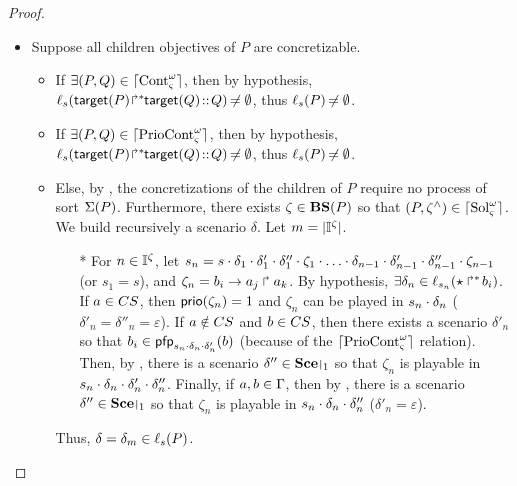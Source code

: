 \begin{proof}
\begin{itemize}
  \item Suppose all children objectives of $P$ are concretizable.
  \begin{itemize}
    \item If $\exists (P, Q) \in \lceil \mathrm{Cont}^\omega_\varsigma\rceil$, then by hypothesis,
      $\ell_{s}({\mathsf{target}(P)\!\Rsh^*\!\!\mathsf{target}(Q)} \!::\! Q) \not\nobreak\mkern -2mu = \emptyset$, thus
      $\ell_{s}(P) \not\nobreak\mkern -2mu = \emptyset$.
    \item If $\exists (P, Q) \in \lceil \mathrm{PrioCont}^\omega_\varsigma\rceil$, then by hypothesis,
      $\ell_{s}({\mathsf{target}(P)\!\Rsh^*\!\!\mathsf{target}(Q)} \!::\! Q) \not\nobreak\mkern -2mu = \emptyset$, thus
      $\ell_{s}(P) \not\nobreak\mkern -2mu = \emptyset$.
    \item Else, by , the concretizations of the children of $P$ require no process of sort $\Sigma(P)$.
      Furthermore, there exists $\zeta \in \mathbf{BS}(P)$ so that $(P, \zeta^\wedge) \in \lceil \mathrm{Sol}^\omega_\varsigma\rceil$.
      We build recursively a scenario $\delta$. Let $m = |\mathbb{I}^{\zeta}|$.
      \begin{itemize}
        \item[*] For $n \in \mathbb{I}^{\zeta}$, let $s_n = s \PHplay \delta_1 \PHplay \delta'_1 \PHplay \delta''_1 \PHplay \zeta_1 \PHplay \dots \PHplay \delta_{n-1} \PHplay \delta'_{n-1} \PHplay \delta''_{n-1} \PHplay \zeta_{n-1}$ (or $s_1 = s$),
          and $\zeta_n = b_i\rightarrow a_j\Rsh a_k$.
          By hypothesis, $\exists \delta_n \in \ell_{s_n}(\mbox{$\star\Rsh^*\!b_i$})$.
          If $a \in CS$, then $\mathsf{prio}(\zeta_n) = 1$ and $\zeta_n$ can be played in $s_n \cdot \delta_n$ (\ie $\delta'_n = \delta''_n = \varepsilon$).
          If $a \notin CS$ and $b \in CS$, then there exists a scenario $\delta'_n$ so that $b_i \in \mathsf{pfp}_{s_n \cdot \delta_n \cdot \delta'_n}(b)$ (because of the $\lceil \mathrm{PrioCont}^\omega_\varsigma\rceil$ relation).
          Then, by , there is a scenario $\delta'' \in \restriction{\Sce}{1}$ so that $\zeta_n$ is playable in $s_n \cdot \delta_n \cdot \delta'_n \cdot \delta''_n$.
          Finally, if $a,b \in \Gamma$, then by , there is a scenario $\delta'' \in \restriction{\Sce}{1}$ so that $\zeta_n$ is playable in $s_n \cdot \delta_n \cdot \delta''_n$ (\ie $\delta'_n = \varepsilon$).
      \end{itemize}
      Thus, $\delta = \delta_m \in \ell_s(P)$. %
  \end{itemize}
\end{itemize}


\end{proof}

